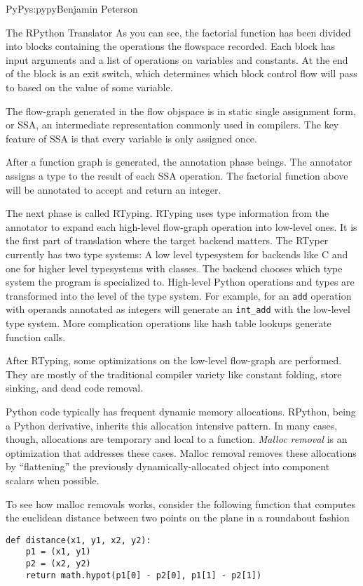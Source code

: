 \begin{aosachapter}{PyPy}{s:pypy}{Benjamin Peterson}
\begin{aosasect1}{The RPython Translator}
As you can see, the factorial function has been divided into blocks containing
the operations the flowspace recorded. Each block has input arguments and a list
of operations on variables and constants. At the end of the block is an exit
switch, which determines which block control flow will pass to based on the
value of some variable.

The flow-graph generated in the flow objspace is in static single assignment
form, or SSA, an intermediate representation commonly used in compilers. The key
feature of SSA is that every variable is only assigned once.

After a function graph is generated, the annotation phase beings. The annotator
assigns a type to the result of each SSA operation. The factorial function above
will be annotated to accept and return an integer.

The next phase is called RTyping. RTyping uses type information from the
annotator to expand each high-level flow-graph operation into low-level ones. It
is the first part of translation where the target backend matters. The RTyper
currently has two type systems: A low level typesystem for backends like C and
one for higher level typesystems with classes. The backend chooses which type
system the program is specialized to. High-level Python operations and types are
transformed into the level of the type system. For example, for an \verb+add+
operation with operands annotated as integers will generate an \verb+int_add+
with the low-level type system. More complication operations like hash table
lookups generate function calls.

After RTyping, some optimizations on the low-level flow-graph are
performed. They are mostly of the traditional compiler variety like constant
folding, store sinking, and dead code removal.

Python code typically has frequent dynamic memory allocations. RPython, being a
Python derivative, inherits this allocation intensive pattern. In many cases,
though, allocations are temporary and local to a function. \emph{Malloc removal}
is an optimization that addresses these cases. Malloc removal removes these
allocations by ``flattening'' the previously dynamically-allocated object into
component scalars when possible.

To see how malloc removals works, consider the following function that computes
the euclidean distance between two points on the plane in a roundabout fashion
\begin{verbatim}
def distance(x1, y1, x2, y2):
    p1 = (x1, y1)
    p2 = (x2, y2)
    return math.hypot(p1[0] - p2[0], p1[1] - p2[1])
\end{verbatim}


\end{aosasect1}
\end{aosachapter}
